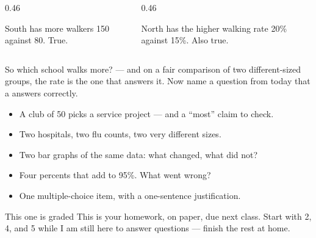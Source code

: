 \documentclass[aspectratio=169, 11pt]{beamer}
\begin{document}
\begin{frame}[t, plain]
  \vspace{6pt}
  \begin{columns}[t]
    \begin{column}{0.46\textwidth}
      \begin{block}{South has more walkers}
        150 against 80. True.
      \end{block}
    \end{column}
    \begin{column}{0.46\textwidth}
      \begin{block}{North has the higher walking rate}
        20\% against 15\%. Also true.
      \end{block}
    \end{column}
  \end{columns}
  \vspace{14pt}
  \begin{block}{So which school walks more?}
     --- and on a fair comparison of two
    different-sized groups, the rate is the one that answers it. Now name a question from
    today that a  answers correctly.
  \end{block}
\end{frame}

\begin{frame}[t, plain]
  \begin{itemize}\setlength{\itemsep}{5pt}
    \item A club of 50 picks a service project --- and a ``most'' claim to check.
    \item Two hospitals, two flu counts, two very different sizes.
    \item Two bar graphs of the same data: what changed, what did not?
    \item Four percents that add to 95\%. What went wrong?
    \item One multiple-choice item, with a one-sentence justification.
  \end{itemize}
  \begin{block}{This one is graded}
    This is your  homework, on paper, due next class. Start with 2, 4, and 5
    while I am still here to answer questions --- finish the rest at home.
  \end{block}
\end{frame}
\end{document}
